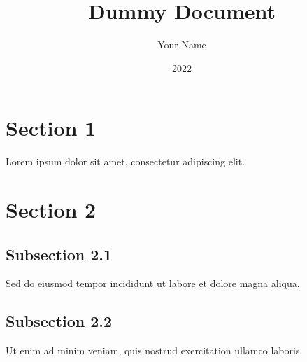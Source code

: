 \documentclass{article}%
\title{Dummy Document}%
\author{Your Name}%
\date{2022}%
\begin{document}
%
\normalsize%
\section{Section 1}%
\label{sec:Section1}%

%
Lorem ipsum dolor sit amet, consectetur adipiscing elit.%
\section{Section 2}%
\label{sec:Section2}%

%
\subsection{Subsection 2.1}%
\label{subsec:Subsection2.1}%

%
Sed do eiusmod tempor incididunt ut labore et dolore magna aliqua.%
\subsection{Subsection 2.2}%
\label{subsec:Subsection2.2}%

%
Ut enim ad minim veniam, quis nostrud exercitation ullamco laboris.%
\end{document}
